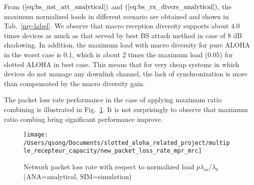 From $(\ref{eq:bs_nst_att_analytical})$ and $(\ref{eq:bs_rx_divers_analytical})$, the maximum normalized loads in different scenario are obtained and shown in Tab.~\ref{my-label}. We observe that macro reception diversity supports about $4.0$ times devices as much as that served by best BS attach method in case of $8$ dB shadowing. 
In addition, the maximum load with macro diversity for pure ALOHA in the worst case is $0.1$, which is about $2$ times the maximum load ($0.05$) for slotted ALOHA in best case. This means that for very cheap systems in which devices do not manage any downlink channel, the lack of synchronization is more than compensated by the macro diversity gain.
\begin{table}[]
	\centering
	\caption{Maximum normalized load under packet loss rate $10\%$ and corresponding diversity gain with $8$ dB shadowing}
	\label{my-label}
\end{table}


The packet loss rate performance in the case of applying maximum ratio combining is illustrated in Fig.~\ref{fig:newpacketlossratemprmrc}. It is not surprisingly to observe that maximum ratio combing bring significant performance improve.
\begin{figure}
	\centering
	\texttt{[image: /Users/qsong/Documents/slotted\_aloha\_related\_project/multiple\_recepteur\_capacity/new\_packet\_loss\_rate\_mpr\_mrc]}
	\caption{Network packet loss rate with respect to normalized load $p\lambda_{m}/\lambda_{b}$ (ANA=analytical, SIM=simulation)}
	\label{fig:newpacketlossratemprmrc}
\end{figure}



